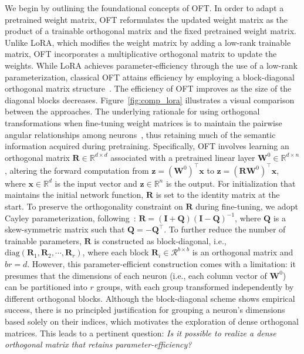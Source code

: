 We begin by outlining the foundational concepts of OFT. In order to adapt a pretrained weight matrix, OFT reformulates the updated weight matrix as the product of a trainable orthogonal matrix and the fixed pretrained weight matrix. Unlike LoRA, which modifies the weight matrix by adding a low-rank trainable matrix, OFT incorporates a multiplicative orthogonal matrix to update the weights. While LoRA achieves parameter-efficiency through the use of a low-rank parameterization, classical OFT attains efficiency by employing a block-diagonal orthogonal matrix structure~\cite{qiu2023controlling}. The efficiency of OFT improves as the size of the diagonal blocks decreases. Figure~\ref{fig:comp_lora} illustrates a visual comparison between the approaches. The underlying rationale for using orthogonal transformations when fine-tuning weight matrices is to maintain the pairwise angular relationships among neurons~\cite{liu2018learning,liu2021orthogonal,qiu2023controlling}, thus retaining much of the semantic information acquired during pretraining. Specifically, OFT involves learning an orthogonal matrix $\bm{R}\in\mathbb{R}^{d\times d}$ associated with a pretrained linear layer $\bm{W}^0\in\mathbb{R}^{d\times n}$, altering the forward computation from $\bm{z}=(\bm{W}^0)^\top\bm{x}$ to $\bm{z}=(\bm{R}\bm{W}^0)^\top\bm{x}$, where $\bm{x}\in\mathbb{R}^{d}$ is the input vector and $\bm{z}\in\mathbb{R}^{n}$ is the output. For initialization that maintains the initial network function, $\bm{R}$ is set to the identity matrix at the start. To preserve the orthogonality constraint on $\bm{R}$ during fine-tuning, we adopt Cayley parameterization, following~\cite{qiu2023controlling,liu2021orthogonal}: $\bm{R}=(\bm{I}+\bm{Q})(\bm{I}-\bm{Q})^{-1}$, where $\bm{Q}$ is a skew-symmetric matrix such that $\bm{Q}=-\bm{Q}^\top$. To further reduce the number of trainable parameters, $\bm{R}$ is constructed as block-diagonal, i.e., $\text{diag}(\bm{R}_1,\bm{R}_2,\cdots,\bm{R}_r)$, where each block $\bm{R}_i\in\mathcal{R}^{b\times b}$ is an orthogonal matrix and $br=d$. However, this parameter-efficient construction comes with a limitation: it presumes that the dimensions of each neuron (i.e., each column vector of $\bm{W}^0$) can be partitioned into $r$ groups, with each group transformed independently by different orthogonal blocks. Although the block-diagonal scheme shows empirical success, there is no principled justification for grouping a neuron's dimensions based solely on their indices, which motivates the exploration of dense orthogonal matrices. This leads to a pertinent question: \emph{Is it possible to realize a dense orthogonal matrix that retains parameter-efficiency?}


